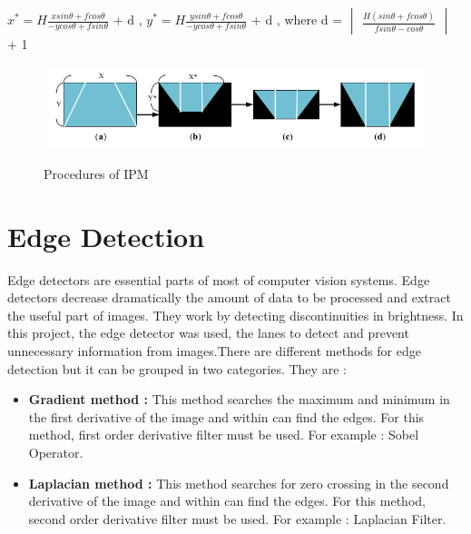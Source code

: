  \begin{center}
 $x^* = H \frac{x sin \theta + f cos \theta}{-y cos \theta + f sin \theta}$ + d ,
 $y^* = H \frac{y sin \theta + f cos \theta}{-y cos \theta + f sin \theta}$ + d ,
 where d = 
 $\begin{vmatrix}
 \frac{H(sin \theta + f cos \theta)}{f sin \theta - cos \theta}
 \end{vmatrix}$ + 1
\end{center}

\begin{figure}[H]
 \centering
  \includegraphics[width=1\textwidth]{./Bilder/Procedures_of_IPM.png}\label{Procedures_of_IPM}
  \caption{Procedures of IPM}
\end{figure}


%
\section{Edge Detection}\label{sec:Edge Detection}
%
Edge detectors are essential parts of most of computer vision systems. Edge detectors decrease dramatically the 
amount of data to be processed and extract the useful part of images. They work by detecting discontinuities in 
brightness.  In this project, the edge detector was used, the lanes to detect and prevent unnecessary information 
from images.There are different methods for edge detection but it can be grouped in two categories. They are :



\begin{itemize}

\item \textbf{Gradient method : } This method searches the maximum and minimum in the first derivative of the image 
and within can find the edges. For this method, first order derivative filter must be used. For example : Sobel 
Operator.
 
\item \textbf{Laplacian method : } This method searches for zero crossing in the second derivative of the image 
and within can find the edges. For this method, second order derivative filter must be used. For example : 
Laplacian Filter.
  
 \end{itemize}
 

